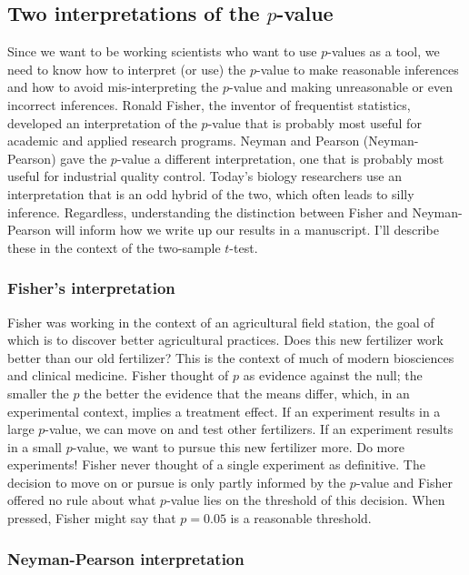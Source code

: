 \documentclass[]{book}
\theoremstyle{definition}
\theoremstyle{definition}
\theoremstyle{definition}
\theoremstyle{remark}
\begin{document}
\subsection{\texorpdfstring{Two interpretations of the
\(p\)-value}{Two interpretations of the p-value}}\label{two-interpretations-of-the-p-value}

Since we want to be working scientists who want to use \(p\)-values as a
tool, we need to know how to interpret (or use) the \(p\)-value to make
reasonable inferences and how to avoid mis-interpreting the \(p\)-value
and making unreasonable or even incorrect inferences. Ronald Fisher, the
inventor of frequentist statistics, developed an interpretation of the
\(p\)-value that is probably most useful for academic and applied
research programs. Neyman and Pearson (Neyman-Pearson) gave the
\(p\)-value a different interpretation, one that is probably most useful
for industrial quality control. Today's biology researchers use an
interpretation that is an odd hybrid of the two, which often leads to
silly inference. Regardless, understanding the distinction between
Fisher and Neyman-Pearson will inform how we write up our results in a
manuscript. I'll describe these in the context of the two-sample
\(t\)-test.

\subsubsection{Fisher's interpretation}\label{fishers-interpretation}

Fisher was working in the context of an agricultural field station, the
goal of which is to discover better agricultural practices. Does this
new fertilizer work better than our old fertilizer? This is the context
of much of modern biosciences and clinical medicine. Fisher thought of
\(p\) as evidence against the null; the smaller the \(p\) the better the
evidence that the means differ, which, in an experimental context,
implies a treatment effect. If an experiment results in a large
\(p\)-value, we can move on and test other fertilizers. If an experiment
results in a small \(p\)-value, we want to pursue this new fertilizer
more. Do more experiments! Fisher never thought of a single experiment
as definitive. The decision to move on or pursue is only partly informed
by the \(p\)-value and Fisher offered no rule about what \(p\)-value
lies on the threshold of this decision. When pressed, Fisher might say
that \(p=0.05\) is a reasonable threshold.

\subsubsection{Neyman-Pearson
interpretation}\label{neyman-pearson-interpretation}
\end{document}
